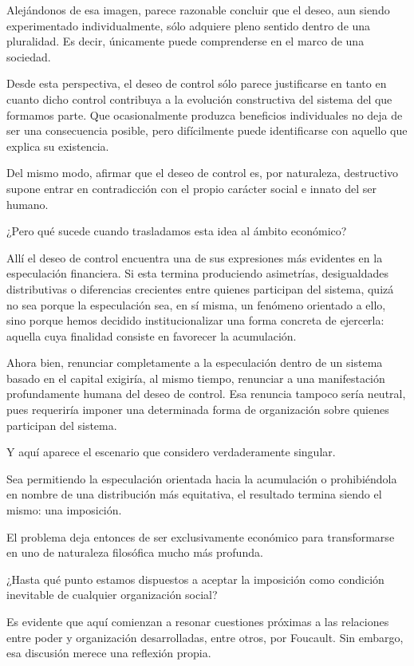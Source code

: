 \documentclass[12pt,a4paper]{article}
\begin{document}
Alejándonos de esa imagen, parece razonable concluir que el deseo, aun siendo experimentado individualmente, sólo adquiere pleno sentido dentro de una pluralidad. Es decir, únicamente puede comprenderse en el marco de una sociedad.

Desde esta perspectiva, el deseo de control sólo parece justificarse en tanto en cuanto dicho control contribuya a la evolución constructiva del sistema del que formamos parte. Que ocasionalmente produzca beneficios individuales no deja de ser una consecuencia posible, pero difícilmente puede identificarse con aquello que explica su existencia.

Del mismo modo, afirmar que el deseo de control es, por naturaleza, destructivo supone entrar en contradicción con el propio carácter social e innato del ser humano.

¿Pero qué sucede cuando trasladamos esta idea al ámbito económico?

Allí el deseo de control encuentra una de sus expresiones más evidentes en la especulación financiera. Si esta termina produciendo asimetrías, desigualdades distributivas o diferencias crecientes entre quienes participan del sistema, quizá no sea porque la especulación sea, en sí misma, un fenómeno orientado a ello, sino porque hemos decidido institucionalizar una forma concreta de ejercerla: aquella cuya finalidad consiste en favorecer la acumulación.

Ahora bien, renunciar completamente a la especulación dentro de un sistema basado en el capital exigiría, al mismo tiempo, renunciar a una manifestación profundamente humana del deseo de control. Esa renuncia tampoco sería neutral, pues requeriría imponer una determinada forma de organización sobre quienes participan del sistema.

Y aquí aparece el escenario que considero verdaderamente singular.

Sea permitiendo la especulación orientada hacia la acumulación o prohibiéndola en nombre de una distribución más equitativa, el resultado termina siendo el mismo: una imposición.

El problema deja entonces de ser exclusivamente económico para transformarse en uno de naturaleza filosófica mucho más profunda.

¿Hasta qué punto estamos dispuestos a aceptar la imposición como condición inevitable de cualquier organización social?

Es evidente que aquí comienzan a resonar cuestiones próximas a las relaciones entre poder y organización desarrolladas, entre otros, por Foucault. Sin embargo, esa discusión merece una reflexión propia.
\end{document}
